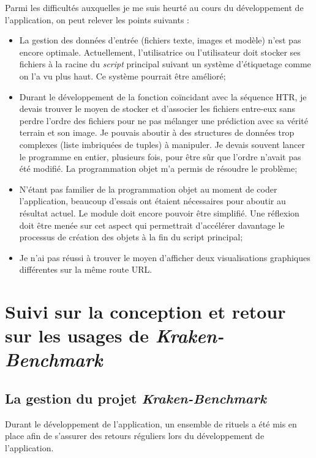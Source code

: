 Parmi les difficultés auxquelles je me suis heurté au cours du développement de l'application, on peut relever les points suivants :

\begin{itemize}
    \item La gestion des données d'entrée (fichiers texte, images et modèle) n'est pas encore optimale. Actuellement, l'utilisatrice ou l'utilisateur doit stocker ses fichiers à la racine du \textit{script} principal suivant un système d'étiquetage comme on l'a vu plus haut. Ce système pourrait être amélioré;
    \item Durant le développement de la fonction coïncidant avec la séquence HTR, je devais trouver le moyen de stocker et d'associer les fichiers entre-eux sans perdre l'ordre des fichiers pour ne pas mélanger une prédiction avec sa vérité terrain et son image. Je pouvais aboutir à des structures de données trop complexes (liste imbriquées de tuples) à manipuler. Je devais souvent lancer le programme en entier, plusieurs fois, pour être sûr que l'ordre n'avait pas été modifié. La programmation objet m'a permis de résoudre le problème;
    \item N'étant pas familier de la programmation objet au moment de coder l'application, beaucoup d'essais ont étaient nécessaires pour aboutir au résultat actuel. Le module  doit encore pouvoir être simplifié. Une réflexion doit être menée sur cet aspect qui permettrait d'accélérer davantage le processus de création des objets à la fin du script principal;
    \item Je n'ai pas réussi à trouver le moyen d'afficher deux visualisations graphiques différentes sur la même route URL. 
\end{itemize}

\section{Suivi sur la conception et retour sur les usages de \textit{Kraken-Benchmark}}

\subsection{La gestion du projet \textit{Kraken-Benchmark}}\label{gestion_projet}

Durant le développement de l'application, un ensemble de rituels a été mis en place afin de s'assurer des retours réguliers lors du développement de l'application.\\

